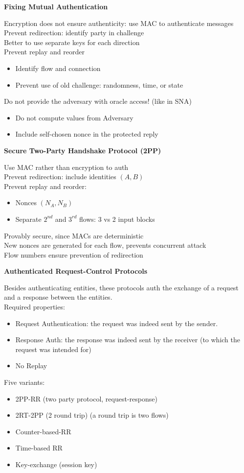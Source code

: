\documentclass{article}
\begin{document}
\textbf{Fixing Mutual Authentication}

Encryption does not ensure authenticity: use MAC to authenticate messages\\
Prevent redirection: identify party in challenge\\
Better to use separate keys for each direction\\
Prevent replay and reorder\begin{itemize}
	\item Identify flow and connection
	\item Prevent use of old challenge: randomness, time, or state
\end{itemize}
Do not provide the adversary with oracle access! (like in SNA)\begin{itemize}
	\item Do not compute values from Adversary
	\item Include self-chosen nonce in the protected reply
\end{itemize}

\textbf{Secure Two-Party Handshake Protocol (2PP)}

Use MAC rather than encryption to auth\\
Prevent redirection: include identities $(A,B)$\\
Prevent replay and reorder:\begin{itemize}
	\item Nonces $(N_A,N_B)$
	\item Separate $2^{nd}$ and $3^{rd}$ flows: 3 vs 2 input blocks
\end{itemize}
Provably secure, since MACs are deterministic\\
New nonces are generated for each flow, prevents concurrent attack\\
Flow numbers ensure prevention of redirection

\textbf{Authenticated Request-Control Protocols}

Besides authenticating entities, these protocols auth the exchange of a request and a response between the entities.\\
Required properties:\begin{itemize}
	\item Request Authentication: the request was indeed sent by the sender.
	\item Response Auth: the response was indeed sent by the receiver (to which the request was intended for)
	\item No Replay
\end{itemize}
Five variants:\begin{itemize}
	\item 2PP-RR (two party protocol, request-response)
	\item 2RT-2PP (2 round trip) (a round trip is two flows)
	\item Counter-based-RR
	\item Time-based RR
	\item Key-exchange (session key)
\end{itemize}
\end{document}

